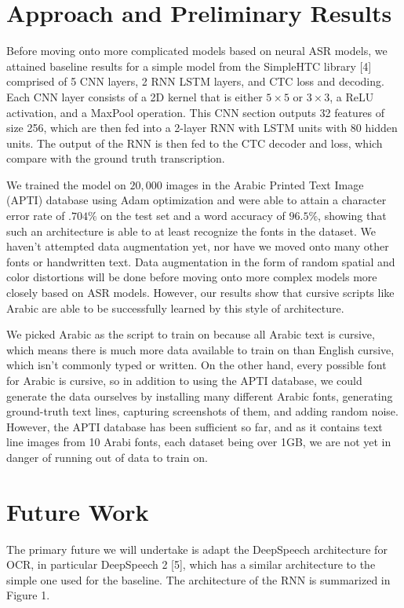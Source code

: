 \documentclass{article}
\begin{document}
\section{Approach and Preliminary Results}
Before moving onto more complicated models based on neural ASR models, we
attained baseline results for a simple model from the SimpleHTC library [4]
comprised of 5 CNN layers, 2 RNN LSTM layers, and CTC loss and decoding. Each CNN
layer consists of a 2D kernel that is either $5 \times 5$ or $3 \times 3$, a
ReLU activation, and a MaxPool operation. This CNN section outputs 32 features
of size 256, which are then fed into a 2-layer RNN with LSTM units with 80
hidden units. The output of the RNN is then fed to the CTC decoder and loss,
which compare with the ground truth transcription.

We trained the model on $20,000$ images in the Arabic Printed Text Image (APTI)
database using Adam optimization and were able to attain a character error rate
of $.704\%$ on the test set and a word accuracy of $96.5\%$, showing that such
an architecture is able to at least recognize the fonts in the dataset. We
haven't attempted data augmentation yet, nor have we moved onto many other fonts
or handwritten text. Data augmentation in the form of random spatial and color
distortions will be done before moving onto more complex models more closely
based on ASR models. However, our results show that cursive scripts like Arabic
are able to be successfully learned by this style of architecture.

We picked Arabic as the script to train on because all Arabic text is cursive,
which means there is much more data available to train on than English cursive,
which isn't commonly typed or written. On the other hand, every possible font
for Arabic is cursive, so in addition to using the APTI database, we could
generate the data ourselves by installing many different Arabic fonts,
generating ground-truth text lines, capturing screenshots of them, and adding
random noise. However, the APTI database has been sufficient so far, and as it
contains text line images from 10 Arabi fonts, each dataset being over 1GB, we
are not yet in danger of running out of data to train on.

\section{Future Work}
The primary future we will undertake is adapt the DeepSpeech architecture for
OCR, in particular DeepSpeech 2 [5], which has a similar architecture to the simple
one used for the baseline. The architecture of the RNN is summarized in Figure
1.
\end{document}

